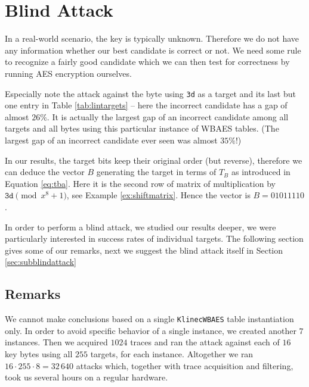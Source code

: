 \section{Blind Attack}
\label{sec:blindattack}

In a real-world scenario, the key is typically unknown. Therefore we do not have any information whether our best candidate is correct or not. We need some rule to recognize a fairly good candidate which we can then test for correctness by running AES encryption ourselves.

\begin{remark}
\label{rem:false}
	Especially note the attack against the  byte using {\tt 3d} as a target and its last but one entry in Table \ref{tab:lintargets} -- here the incorrect candidate has a gap of almost $26\%$. It is actually the largest gap of an incorrect candidate among all targets and all bytes using this particular instance of WBAES tables. (The largest gap of an incorrect candidate ever seen was almost $35\%$!)
	
	In our results, the target bits keep their original order (but reverse), therefore we can deduce the vector $B$ generating the target in terms of $T_B$ as introduced in Equation \ref{eq:tba}. Here it is the second row of matrix of multiplication by $\texttt{3d}\pmod{x^8+1}$, see Example \ref{ex:shiftmatrix}. Hence the vector is $B = 01011110$.
\end{remark}

In order to perform a blind attack, we studied our results deeper, we were particularly interested in success rates of individual targets. The following section gives some of our remarks, next we suggest the blind attack itself in Section \ref{sec:subblindattack}



\subsection{Remarks}
\label{sec:remarks}

We cannot make conclusions based on a single {\tt KlinecWBAES} table instantiation only. In order to avoid specific behavior of a single instance, we created another $7$ instances. Then we acquired $1024$ traces and ran the attack against each of $16$ key bytes using all $255$ targets, for each instance. Altogether we ran $16\cdot255\cdot8=32\,640$ attacks which, together with trace acquisition and filtering, took us several hours on a regular hardware.

